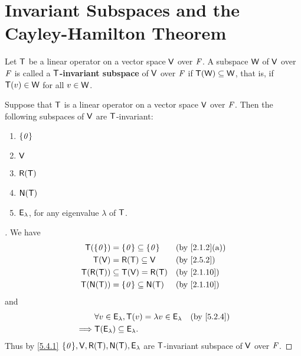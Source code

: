 \section{Invariant Subspaces and the Cayley-Hamilton Theorem}\label{sec:5.4}

\begin{defn}\label{5.4.1}
  Let \(\mathsf{T}\) be a linear operator on a vector space \(\mathsf{V}\) over \(\mathit{F}\).
  A subspace \(\mathsf{W}\) of \(\mathsf{V}\) over \(\mathit{F}\) is called a \textbf{\(\mathsf{T}\)-invariant subspace} of \(\mathsf{V}\) over \(\mathit{F}\) if \(\mathsf{T}(\mathsf{W}) \subseteq \mathsf{W}\), that is, if \(\mathsf{T}(v) \in \mathsf{W}\) for all \(v \in \mathsf{W}\).
\end{defn}

\begin{eg}\label{5.4.2}
  Suppose that \(\mathsf{T}\) is a linear operator on a vector space \(\mathsf{V}\) over \(\mathit{F}\).
  Then the following subspaces of \(\mathsf{V}\) are \(\mathsf{T}\)-invariant:
  \begin{enumerate}
    \item \(\left\lbrace\mathit{0}\right\rbrace\)
    \item \(\mathsf{V}\)
    \item \(\rg{\T}\)
    \item \(\ns{\T}\)
    \item \(\mathsf{E}_{\lambda}\), for any eigenvalue \(\lambda\) of \(\mathsf{T}\).
  \end{enumerate}
\end{eg}

\begin{proof}[]
  We have
  \begin{align*}
    \T(\set{\zv}) & = \set{\zv} \subseteq \set{\zv} &  & \by{2.1.2}[a] \\
    \T(\V)        & = \rg{\T} \subseteq \V          &  & \by{2.5.2}    \\
    \T(\rg{\T})   & \subseteq \T(\V) = \rg{\T}      &  & \by{2.1.10}   \\
    \T(\ns{\T})   & = \set{\zv} \subseteq \ns{\T}   &  & \by{2.1.10}
  \end{align*}
  and
  \begin{align*}
             & \forall v \in \vs{E}_{\lambda}, \T(v) = \lambda v \in \vs{E}_{\lambda} &  & \by{5.2.4} \\
    \implies & \T(\vs{E}_{\lambda}) \subseteq \vs{E}_{\lambda}.
  \end{align*}
  Thus by \cref{5.4.1} \(\set{\zv}, \V, \rg{\T}, \ns{\T}, \vs{E}_{\lambda}\) are \(\mathsf{T}\)-invariant subspace of \(\mathsf{V}\) over \(\mathit{F}\).
\end{proof}


